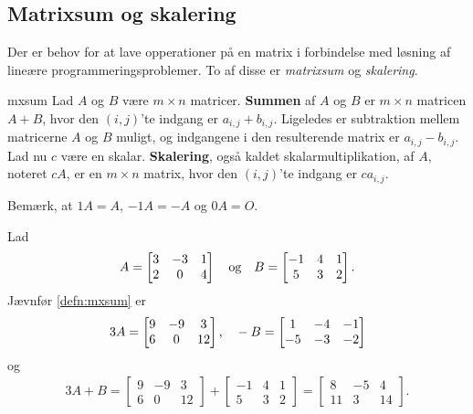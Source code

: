 \subsection{Matrixsum og skalering}
% 
Der er behov for at lave opperationer på en matrix i forbindelse med løsning af lineære programmeringsproblemer. 
To af disse er \textit{matrixsum} og \textit{skalering}.
%
\begin{defn}{}{mxsum} %
Lad $A$ og $B$ være $m \times n$ matricer.
\textbf{Summen} af $A$ og $B$ er $m \times n$ matricen $A + B$, hvor den $(i,j)$'te indgang er $a_{i,j} + b_{i,j}$.
Ligeledes er subtraktion mellem matricerne $A$ og $B$ muligt, og indgangene i den resulterende matrix er $a_{i,j} - b_{i,j}$.
\\
Lad nu $c$ være en skalar.
\textbf{Skalering}, også kaldet skalarmultiplikation, af $A$, noteret $cA$, er en $m \times n$ matrix, hvor den $(i,j)$'te indgang er $ca_{i,j}$.
\end{defn}
\noindent
%
Bemærk, at $1A = A$, $-1A = -A$ og $0A = O$.
\\
%
\begin{eks}
Lad 
\begin{align*}
A= 
\begin{bmatrix}
3	&	-3	&	1\\
2	&	0	&	4
\end{bmatrix}
\text{\phantom{---}og\phantom{---}}
B= 
\begin{bmatrix}
-1	&	4	&	1\\
5	&	3	&	2
\end{bmatrix}.
\end{align*}
Jævnfør \ref{defn:mxsum} er
\begin{align*}
3A= 
\begin{bmatrix}
9	&	-9	&	3\\
6	&	0	&	12
\end{bmatrix}
\text{,\phantom{---}}
-B= 
\begin{bmatrix}
1	&	-4	&	-1\\
-5	&	-3	&	-2
\end{bmatrix}
\end{align*}
og
\begin{align*}
3A+B= 
\begin{bmatrix}
9	&	-9	&	3\\
6	&	0	&	12
\end{bmatrix}
+ 
\begin{bmatrix}
-1	&	4	&	1\\
5	&	3	&	2
\end{bmatrix}
=
\begin{bmatrix}
8	&	-5	&	4\\
11	&	3	&	14
\end{bmatrix}.
\end{align*}
\end{eks}
